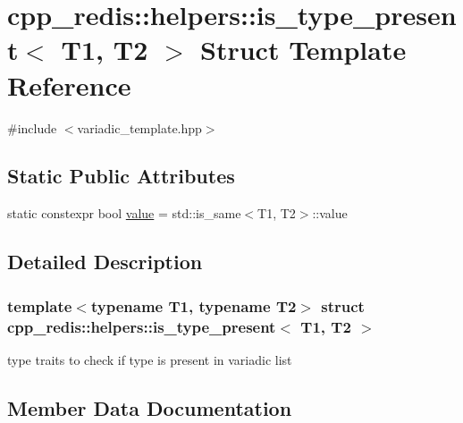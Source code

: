 \hypertarget{structcpp__redis_1_1helpers_1_1is__type__present_3_01_t1_00_01_t2_01_4}{}\section{cpp\+\_\+redis\+:\+:helpers\+:\+:is\+\_\+type\+\_\+present$<$ T1, T2 $>$ Struct Template Reference}
\label{structcpp__redis_1_1helpers_1_1is__type__present_3_01_t1_00_01_t2_01_4}


{\ttfamily \#include $<$variadic\+\_\+template.\+hpp$>$}

\subsection*{Static Public Attributes}
\begin{DoxyCompactItemize}
\item 
static constexpr bool \hyperlink{structcpp__redis_1_1helpers_1_1is__type__present_3_01_t1_00_01_t2_01_4_a1dbf43b76ba407caf9bfb35ffdbe55ad}{value} = std\+::is\+\_\+same$<$T1, T2$>$\+::value
\end{DoxyCompactItemize}


\subsection{Detailed Description}
\subsubsection*{template$<$typename T1, typename T2$>$\newline
struct cpp\+\_\+redis\+::helpers\+::is\+\_\+type\+\_\+present$<$ T1, T2 $>$}

type traits to check if type is present in variadic list 

\subsection{Member Data Documentation}
\mbox{\label{structcpp__redis_1_1helpers_1_1is__type__present_3_01_t1_00_01_t2_01_4_a1dbf43b76ba407caf9bfb35ffdbe55ad}} 
